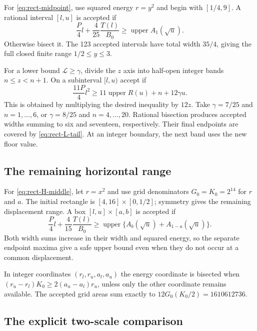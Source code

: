 \documentclass[11pt,reqno]{amsart}
\numberwithin{equation}{section}
\begin{document}
For \eqref{eq:rect-midpoint}, use squared energy $r=y^2$ and
begin with $[1/4,9]$. A rational interval $[l,u]$ is accepted if
\begin{equation}\label{eq:rect-midpoint-box}
 \frac P4l+\frac4{25}\frac{T(l)}{B_0}
 \ge\operatorname{upper}A_1(\sqrt u).
\end{equation}
Otherwise bisect it. The 123 accepted intervals have total
width $35/4$, giving the full closed finite range
$1/2\le y\le3$.

For a lower bound $\mathcal L\ge\gamma$, divide the $z$
axis into half-open integer bands $n\le z<n+1$. On a
subinterval $[l,u)$ accept if
\begin{equation}\label{eq:rect-L-box}
 \frac{11P}{4}l^2
 \ge11\operatorname{upper}R(u)+n+12\gamma u.
\end{equation}
This is obtained by multiplying the desired inequality by
$12z$. Take $\gamma=7/25$ and $n=1,\ldots,6$, or
$\gamma=8/25$ and $n=4,\ldots,20$. Rational bisection
produces accepted widths summing to six and seventeen,
respectively. Their final endpoints are covered by
\eqref{eq:rect-L-tail}. At an integer boundary, the next
band uses the new floor value.

\subsection*{The remaining horizontal range}

For \eqref{eq:rect-H-middle}, let $r=x^2$ and use grid
denominators $G_0=K_0=2^{14}$ for $r$ and $a$. The initial
rectangle is $[4,16]\times[0,1/2]$; symmetry gives the
remaining displacement range. A box $[l,u]\times[a,b]$ is
accepted if
\begin{equation}\label{eq:rect-H-box}
 \frac P4l+\frac4{15}\frac{T(l)}{B_0}
 \ge\operatorname{upper}
       \{A_b(\sqrt u)+A_{1-a}(\sqrt u)\}.
\end{equation}
Both width sums increase in their width and squared energy,
so the separate endpoint maxima give a safe upper bound even
when they do not occur at a common displacement.

In integer coordinates $(r_l,r_u,a_l,a_u)$ the energy
coordinate is bisected when
$(r_u-r_l)K_0\ge2(a_u-a_l)r_u$, unless only the other
coordinate remains available. The accepted grid areas sum
exactly to $12G_0(K_0/2)=1610612736$.

\subsection*{The explicit two-scale comparison}
\end{document}
